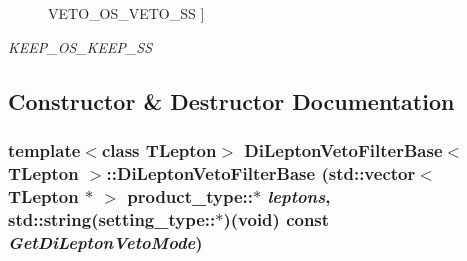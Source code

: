 \begin{Desc}
\begin{description}
{\hypertarget{classDiLeptonVetoFilterBase_a61fbc3c58cdc545f10826f677cecd0feaeda61ce7fe92ad3daf4ebe4c7354403a}{
VETO\_\-OS\_\-VETO\_\-SS}
\label{classDiLeptonVetoFilterBase_a61fbc3c58cdc545f10826f677cecd0feaeda61ce7fe92ad3daf4ebe4c7354403a}
}]\item[{\em 
\hypertarget{classDiLeptonVetoFilterBase_a61fbc3c58cdc545f10826f677cecd0fea93bf1585b32e974917ebd99858e14fbe}{
KEEP\_\-OS\_\-KEEP\_\-SS}
\label{classDiLeptonVetoFilterBase_a61fbc3c58cdc545f10826f677cecd0fea93bf1585b32e974917ebd99858e14fbe}
}]\end{description}
\end{Desc}



\subsection{Constructor \& Destructor Documentation}
\hypertarget{classDiLeptonVetoFilterBase_acaa3d72c0af99599541c3fcb11829184}{
\subsubsection[{DiLeptonVetoFilterBase}]{\setlength{\rightskip}{0pt plus 5cm}template$<$class TLepton$>$ {\bf DiLeptonVetoFilterBase}$<$ TLepton $>$::{\bf DiLeptonVetoFilterBase} (std::vector$<$ TLepton $\ast$ $>$ product\_\-type::$\ast$ {\em leptons}, \/  std::string(setting\_\-type::$\ast$)(void) const  {\em GetDiLeptonVetoMode})}}
\label{classDiLeptonVetoFilterBase_acaa3d72c0af99599541c3fcb11829184}


